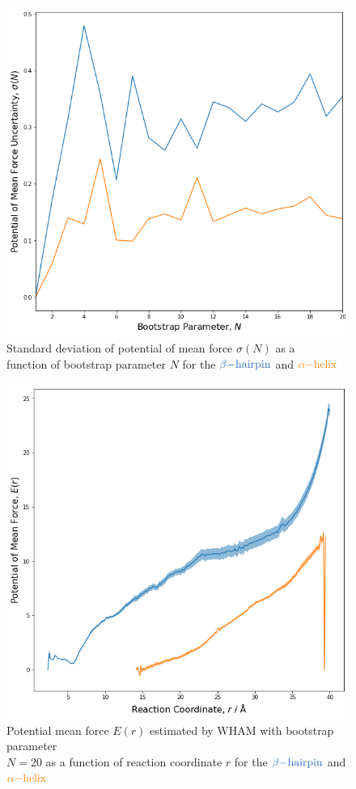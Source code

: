 \documentclass{article}[12pt]
\numberwithin{equation}{section}
\begin{document}
\begin{figure}[H]
	\centering{}
	\captionsetup{justification=centering}
	\includegraphics[scale=0.41]{bootstrap}
\caption{Standard deviation of potential of mean force $\sigma(N)$ as a \\function of bootstrap parameter $N$
for the $\color{NavyBlue}{\beta\mathrm{-hairpin}}$ and $\color{orange}{\alpha\mathrm{-helix}}$}
\label{fig:bootstrap}
\end{figure}
\begin{figure}[H]
	\centering{}
	\captionsetup{justification=centering}
	\includegraphics[scale=0.41]{pmf}
\caption{Potential mean force $E(r)$ estimated by WHAM with bootstrap parameter\\$N=20$
as a function of reaction coordinate $r$
for the $\color{NavyBlue}{\beta\mathrm{-hairpin}}$ and $\color{orange}{\alpha\mathrm{-helix}}$}
\label{fig:pmf}
\end{figure}
\end{document}
